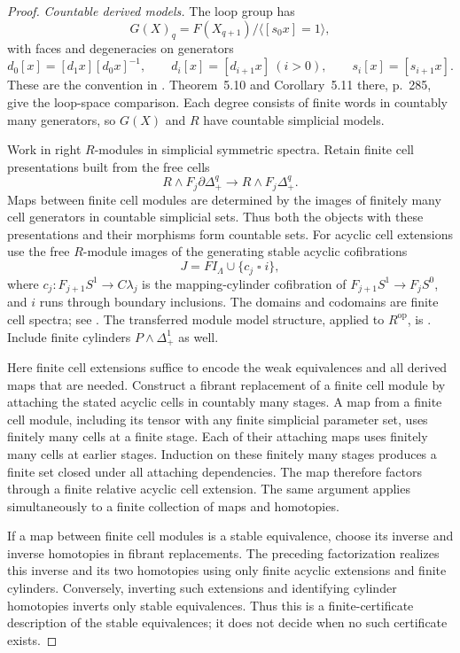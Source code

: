 \begin{proof}
\emph{Countable derived models.}
The loop group has
\[
 G(X)_q=F(X_{q+1})/\langle[s_0x]=1\rangle,
\]
with faces and degeneracies on generators
\[
 d_0[x]=[d_1x][d_0x]^{-1},\qquad
 d_i[x]=[d_{i+1}x]\ (i>0),\qquad
 s_i[x]=[s_{i+1}x].
\]
These are the convention in
\cite[V.5, formula~(5.1), p.~276]{GoerssJardine1999}.
Theorem~5.10 and Corollary~5.11 there, p.~285, give the loop-space
comparison.  Each degree consists of finite words in countably many
generators, so $G(X)$ and $R$ have countable simplicial models.

Work in right $R$-modules in simplicial symmetric spectra.  Retain
finite cell presentations built from the free cells
\[
 R\wedge F_j\partial\Delta^q_+
       \longrightarrow R\wedge F_j\Delta^q_+.
\]
Maps between finite cell modules are determined by the images of
finitely many cell generators in countable simplicial sets.  Thus
both the objects with these presentations and their morphisms form
countable sets.  For acyclic cell extensions use the free $R$-module
images of the generating stable acyclic cofibrations
\[
 J=FI_\Lambda\cup\{c_j\mathbin\square i\},
\]
where $c_j:F_{j+1}S^1\to C\lambda_j$ is the mapping-cylinder
cofibration of $F_{j+1}S^1\to F_jS^0$, and $i$ runs through boundary
inclusions.  The domains and codomains are finite cell spectra;
see \cite[Theorem~3.4.4 and Definition~3.4.9, pp.~180--182]
{HoveyShipleySmith2000}.  The transferred module model structure,
applied to $R^{\mathrm{op}}$, is
\cite[Theorem~4.1(1), p.~499; proof p.~505]{SchwedeShipley2000}.
Include finite cylinders $P\wedge\Delta^1_+$ as well.

Here finite cell extensions suffice to encode the weak equivalences
and all derived maps that are needed.  Construct a fibrant replacement
of a finite cell module by attaching the stated acyclic cells in
countably many stages.  A map from a finite cell module, including its
tensor with any finite simplicial parameter set, uses finitely many
cells at a finite stage.  Each of their attaching maps uses finitely
many cells at earlier stages.  Induction on these finitely many stages
produces a finite set closed under all attaching dependencies.
The map therefore factors through a finite relative acyclic cell
extension.  The same argument applies simultaneously to a finite
collection of maps and homotopies.

If a map between finite cell modules is a stable equivalence, choose
its inverse and inverse homotopies in fibrant replacements.  The
preceding factorization realizes this inverse and its two homotopies
using only finite acyclic extensions and finite cylinders.  Conversely,
inverting such extensions and identifying cylinder homotopies inverts
only stable equivalences.  Thus this is a finite-certificate
description of the stable equivalences; it does not decide when no
such certificate exists.


\end{proof}
